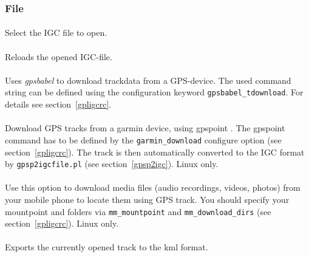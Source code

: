 \subsubsection{File}

\paragraph{%
}
Select the IGC file to open.

\paragraph{%
}
Reloads the opened IGC-file.

\paragraph{%
}
Uses \emph{gpsbabel} \cite{gpsbabel} to download trackdata from a GPS-device.
The used command string can be defined using the configuration keyword \texttt{gpsbabel\_tdownload}.
For details see section~\ref{gpligcrc}.

\paragraph{%
}
Download GPS tracks from a garmin device, using gpspoint \cite{gpspoint}.
The gpspoint command has to be defined by the \texttt{garmin\_download} configure option (see section~\ref{gpligcrc}).
The track is then automatically converted to the IGC format by \texttt{gpsp2igcfile.pl} (see section~\ref{gpsp2igc}).
Linux only.

\paragraph{%
}
Use this option to download media files (audio recordings, videos, photos) from your mobile phone to locate them using GPS track.
You should specify your mountpoint and folders via \texttt{mm\_mountpoint} and \texttt{mm\_download\_dirs} (see section~\ref{gpligcrc}).
Linux only.

\paragraph{%
}
Exports the currently opened track to the kml format.

